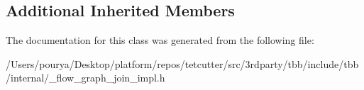 \subsection*{Additional Inherited Members}


The documentation for this class was generated from the following file\+:\begin{DoxyCompactItemize}
\item 
/\+Users/pourya/\+Desktop/platform/repos/tetcutter/src/3rdparty/tbb/include/tbb/internal/\+\_\+flow\+\_\+graph\+\_\+join\+\_\+impl.\+h\end{DoxyCompactItemize}
